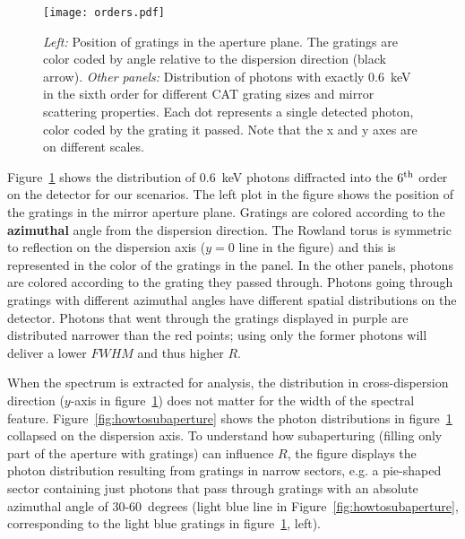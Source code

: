 \documentclass[12pt]{spieman}  %
\begin{document}
\begin{spacing}{1}
\begin{figure} [ht]
\begin{center}
\texttt{[image: orders.pdf]}
\end{center}
\caption {\label{fig:orders}
  \emph{Left:} Position of gratings in the aperture plane. The gratings are color coded by angle relative to the dispersion direction (black arrow).
  \emph{Other panels:} Distribution of photons with exactly 0.6~keV in the sixth order for different CAT grating sizes and mirror scattering properties. Each dot represents a single detected photon, color coded by the grating it passed. Note that the x and y axes are on different scales.
}
\end{figure}

Figure~\ref{fig:orders} shows the distribution of 0.6~keV photons diffracted
into the $6^{\rm th}$ order on the detector for our scenarios.
The left plot in the figure shows the position
of the gratings in the mirror aperture plane. Gratings are colored according to the
\textbf{azimuthal} angle from the dispersion direction. The Rowland torus is symmetric to reflection on the dispersion axis ($y=0$ line in the figure) and this is represented in the color of the gratings in the panel.
In the other panels, photons are colored according to the grating they passed through. Photons going through gratings with different azimuthal angles have different spatial distributions on the detector.
Photons that went through the gratings displayed in purple are distributed narrower than the red points; using only the former photons will deliver a lower $FWHM$ and thus higher $R$.

When the spectrum is extracted for analysis, the distribution in cross-dispersion direction ($y$-axis in figure~\ref{fig:orders}) does not matter for the width of the spectral feature. Figure~\ref{fig:howtosubaperture} shows the photon distributions in figure~\ref{fig:orders} collapsed on the dispersion axis. To understand how subaperturing (filling only part of the aperture with gratings) can influence $R$, the figure displays the photon distribution resulting from gratings in narrow sectors, e.g. a pie-shaped sector containing just photons that pass through gratings with an absolute azimuthal angle of 30-60~degrees (light blue line in Figure~\ref{fig:howtosubaperture}, corresponding to the light blue gratings in figure~\ref{fig:orders}, left).


\end{spacing}
\end{document}

